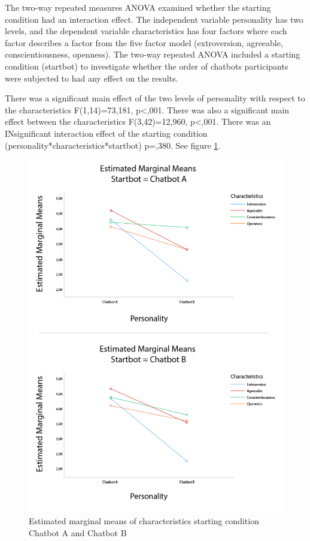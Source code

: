 The two-way repeated measures ANOVA examined whether the starting condition had an interaction effect. The independent variable personality has two levels, and the dependent variable characteristics has four factors where each factor describes a factor from the five factor model (extroversion, agreeable, conscientiousness, openness). The two-way repeated ANOVA included a starting condition (startbot) to investigate whether the order of chatbots participants were subjected to had any effect on the results.

There was a significant main effect of the two levels of personality with respect to the characteristics F(1,14)=73,181, p<,001. There was also a significant main effect between the characteristics F(3,42)=12,960, p<,001. There was an INsignificant interaction effect of the starting condition (personality*characteristics*startbot) p=,380. See figure \ref{fig:characstartAB}.

\begin{figure}[H]
    \centering
    \includegraphics[scale=0.4]{figures/MMeanStartbotABCharacteristics.png}
    \caption{Estimated marginal means of characteristics starting condition Chatbot A and Chatbot B}
    \label{fig:characstartAB}
\end{figure}

